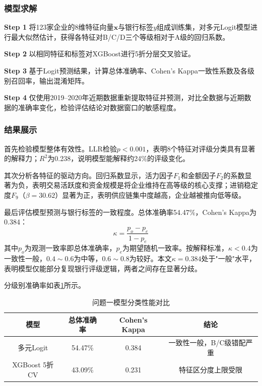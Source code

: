 \documentclass[12pt,a4paper,AutoFakeBold=2]{ctexart}
\newcommand{\step}[1]{\par\noindent\textbf{Step #1}\quad}
\begin{document}
\subsubsection{模型求解}

\step{1} 将123家企业的8维特征向量$\mathbf{x}$与银行标签$y$组成训练集，对多元Logit模型进行最大似然估计，获得各特征对B/C/D三个等级相对于A级的回归系数。

\step{2} 以相同特征和标签对XGBoost进行5折分层交叉验证。

\step{3} 基于Logit预测结果，计算总体准确率、Cohen's Kappa一致性系数及各级别召回率，输出混淆矩阵。

\step{4} 仅使用2019--2020年近期数据重新提取特征并预测，对比全数据与近期数据的准确率变化，检验评估结论对数据窗口的敏感程度。

\subsubsection{结果展示}

首先检验模型整体有效性。LLR检验$p<0.001$，表明8个特征对评级分类具有显著的解释力；$R^2$为0.238，说明模型能解释约24\%的评级变化。

其次分析各特征的驱动方向。回归系数显示，活力因子$F_1$和金额因子$F_2$的系数显著为负，表明交易活跃度和资金规模是将企业维持在高等级的核心支撑；进销稳定度$F_9$（$\beta=30.62$）显著为正，表明供应链集中度越高，企业越被推向低等级。

最后评估模型预测与银行标签的一致程度。总体准确率54.47\%，Cohen's Kappa为0.384：
\begin{equation}
\kappa = \frac{p_o - p_e}{1 - p_e}
\label{eq:kappa}
\end{equation}
其中$p_o$为观测一致率即总体准确率，$p_e$为期望随机一致率。按解释标准，$\kappa<0.4$为一致性一般，$0.4\sim0.6$为中等，$0.6\sim0.8$为较好。本文$\kappa=0.384$处于"一般"水平，表明模型仅能部分复现银行评级逻辑，两者之间存在显著分歧。

分级别准确率如表\ref{tab:logit_perf}所示。

\begin{table}[H]
\centering
\caption{问题一模型分类性能对比}
\label{tab:logit_perf}
\begin{tabular}{cccc}
\toprule
模型 & 总体准确率 & Cohen's Kappa & 结论 \\
\midrule
多元Logit & 54.47\% & 0.384 & 一致性一般，B/C级错配严重 \\
XGBoost 5折CV & 43.09\% & 0.231 & 特征区分度上限受限 \\
\bottomrule
\end{tabular}
\end{table}
\end{document}

